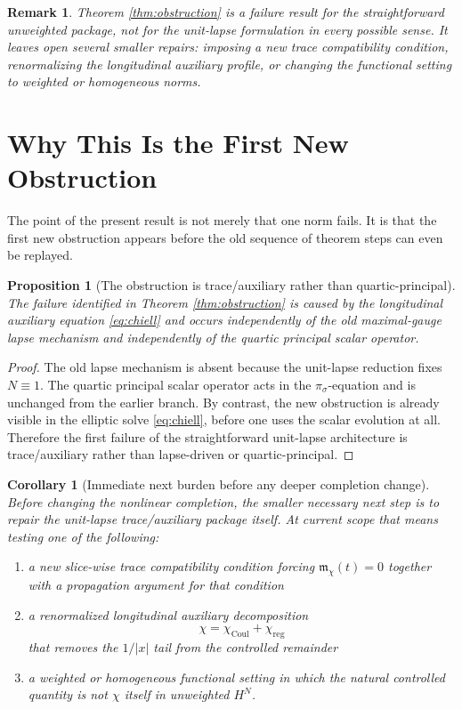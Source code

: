 \documentclass[11pt]{article}
\newtheorem{proposition}{Proposition}
\newtheorem{remark}{Remark}
\newtheorem{corollary}{Corollary}
\begin{document}
\begin{remark}
Theorem \ref{thm:obstruction} is a failure result for the \emph{straightforward unweighted package}, not for the unit-lapse formulation in every possible sense. It leaves open several smaller repairs: imposing a new trace compatibility condition, renormalizing the longitudinal auxiliary profile, or changing the functional setting to weighted or homogeneous norms.
\end{remark}

\section{Why This Is the First New Obstruction}

The point of the present result is not merely that one norm fails. It is that the first new obstruction appears before the old sequence of theorem steps can even be replayed.

\begin{proposition}[The obstruction is trace/auxiliary rather than quartic-principal]
The failure identified in Theorem \ref{thm:obstruction} is caused by the longitudinal auxiliary equation \eqref{eq:chiell} and occurs independently of the old maximal-gauge lapse mechanism and independently of the quartic principal scalar operator.
\end{proposition}

\begin{proof}
The old lapse mechanism is absent because the unit-lapse reduction fixes \(N\equiv 1\). The quartic principal scalar operator acts in the \(\pi_\sigma\)-equation and is unchanged from the earlier branch. By contrast, the new obstruction is already visible in the elliptic solve \eqref{eq:chiell}, before one uses the scalar evolution at all. Therefore the first failure of the straightforward unit-lapse architecture is trace/auxiliary rather than lapse-driven or quartic-principal.
\end{proof}

\begin{corollary}[Immediate next burden before any deeper completion change]
Before changing the nonlinear completion, the smaller necessary next step is to repair the unit-lapse trace/auxiliary package itself. At current scope that means testing one of the following:
\begin{enumerate}
    \item a new slice-wise trace compatibility condition forcing \(\mathfrak m_\chi(t)=0\) together with a propagation argument for that condition
    \item a renormalized longitudinal auxiliary decomposition
    \[
    \chi = \chi_{\mathrm{Coul}} + \chi_{\mathrm{reg}}
    \]
    that removes the \(1/|x|\) tail from the controlled remainder
    \item a weighted or homogeneous functional setting in which the natural controlled quantity is not \(\chi\) itself in unweighted \(H^N\).
\end{enumerate}
\end{corollary}
\end{document}
